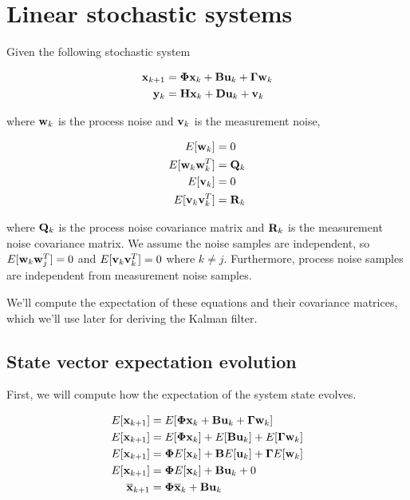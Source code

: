 \section{Linear stochastic systems}

Given the following stochastic system

\begin{align*}
  \mathbf{x}_{k+1} &= \mathbf{\Phi}\mathbf{x}_k + \mathbf{B}\mathbf{u}_k +
    \mathbf{\Gamma}\mathbf{w}_k \\
  \mathbf{y}_k &= \mathbf{H}\mathbf{x}_k + \mathbf{D}\mathbf{u}_k + \mathbf{v}_k
\end{align*}

where $\mathbf{w}_k$ is the process noise and $\mathbf{v}_k$ is the measurement noise,

\begin{align*}
  E[\mathbf{w}_k] &= 0 \\
  E[\mathbf{w}_k\mathbf{w}_k^T] &= \mathbf{Q}_k \\
  E[\mathbf{v}_k] &= 0 \\
  E[\mathbf{v}_k\mathbf{v}_k^T] &= \mathbf{R}_k
\end{align*}

where $\mathbf{Q}_k$ is the process noise covariance matrix and $\mathbf{R}_k$ is the
measurement noise covariance matrix. We assume the noise samples are
independent, so $E[\mathbf{w}_k\mathbf{w}_j^T] = 0$ and $E[\mathbf{v}_k\mathbf{v}_k^T] = 0$
where $k \neq j$. Furthermore, process noise samples are independent from
measurement noise samples.

We'll compute the expectation of these equations and their covariance matrices,
which we'll use later for deriving the Kalman filter.

\subsection{State vector expectation evolution}

First, we will compute how the expectation of the system state evolves.

\begin{align*}
  E[\mathbf{x}_{k+1}] &= E[\mathbf{\Phi}\mathbf{x}_k + \mathbf{B}\mathbf{u}_k +
    \mathbf{\Gamma}\mathbf{w}_k] \\
  E[\mathbf{x}_{k+1}] &= E[\mathbf{\Phi}\mathbf{x}_k] + E[\mathbf{B}\mathbf{u}_k] +
    E[\mathbf{\Gamma}\mathbf{w}_k] \\
  E[\mathbf{x}_{k+1}] &= \mathbf{\Phi}E[\mathbf{x}_k] + \mathbf{B}E[\mathbf{u}_k] +
    \mathbf{\Gamma}E[\mathbf{w}_k] \\
  E[\mathbf{x}_{k+1}] &= \mathbf{\Phi}E[\mathbf{x}_k] + \mathbf{B}\mathbf{u}_k + 0 \\
  \overline{\mathbf{x}}_{k+1} &= \mathbf{\Phi}\overline{\mathbf{x}}_k +
    \mathbf{B}\mathbf{u}_k \\
\end{align*}

